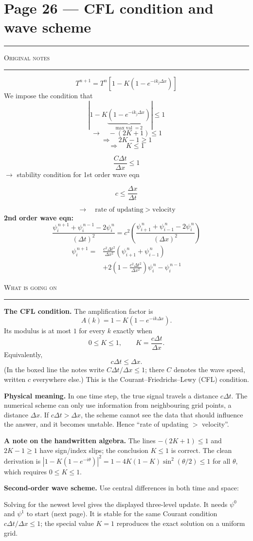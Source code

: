 \documentclass[10pt,a4paper]{article}
\newcommand{\fiteq}[1]{\par\noindent\adjustbox{max width=\linewidth}{$\displaystyle #1$}\par}
\newcommand{\pairpage}[3]{%
  \clearpage
  \section*{\normalsize Page #1}
  \vspace{-0.9em}
  {\color{black!35}\rule{\linewidth}{0.4pt}}\par\vspace{0.2em}
  \noindent
  \begin{minipage}[t]{0.473\textwidth}
    {\scriptsize\textsc{Original notes}}\par\vspace{0.15em}
    {\color{black!25}\rule{\linewidth}{0.3pt}}\par\vspace{0.2em}
    #2
  \end{minipage}%
  \hfill
  \begin{minipage}[t]{0.473\textwidth}
    {\scriptsize\textsc{What is going on}}\par\vspace{0.15em}
    {\color{black!25}\rule{\linewidth}{0.3pt}}\par\vspace{0.2em}
    #3
  \end{minipage}%
}
\begin{document}
\pairpage{26 --- CFL condition and wave scheme}{%
\[
T^{n+1}=T^n\left[1-K\left(1-e^{-ik_j\Delta x}\right)\right]
\]
We impose the condition that
\[
\left|1-K\underbrace{\left(1-e^{-ik_j\Delta x}\right)}
_{\text{max val }=2}\right|\le1
\]
\[
\longrightarrow\quad -(2K+1)\le1
\]
\[
\Rightarrow\quad 2K-1\ge1
\]
\[
\Rightarrow\quad \boxed{K\le1}
\]
\begin{handbox}
\[
\frac{C\Delta t}{\Delta x}\le1
\]
{\small $\to$ stability condition for 1st order wave eqn}
\end{handbox}
\begin{handbox}
\[
c\le\frac{\Delta x}{\Delta t}
\]
\end{handbox}
\[
\longrightarrow\quad\text{rate of updating}>\text{velocity}
\]
\textbf{2nd order wave eqn:}
\[
\frac{\psi_i^{\,n+1}+\psi_i^{\,n-1}-2\psi_i^{\,n}}{(\Delta t)^2}
=c^2\left(
\frac{\psi_{i+1}^{\,n}+\psi_{i-1}^{\,n}-2\psi_i^{\,n}}{(\Delta x)^2}
\right)
\]
\[
\begin{aligned}
\psi_i^{\,n+1}={}&\frac{c^2\Delta t^2}{\Delta x^2}
\left(\psi_{i+1}^{\,n}+\psi_{i-1}^{\,n}\right)\\
&+2\left(1-\frac{c^2\Delta t^2}{\Delta x^2}\right)\psi_i^{\,n}
-\psi_i^{\,n-1}
\end{aligned}
\]
}{%
\textbf{The CFL condition.} The amplification factor is
\[
A(k)=1-K(1-e^{-ik\Delta x}).
\]
Its modulus is at most $1$ for every $k$ exactly when
\[
0\le K\le1,
\qquad K=\frac{c\Delta t}{\Delta x}.
\]
Equivalently,
\[
c\Delta t\le\Delta x.
\]
(In the boxed line the notes write $C\Delta t/\Delta x\le1$; there $C$
denotes the wave speed, written $c$ everywhere else.)
This is the Courant--Friedrichs--Lewy (CFL) condition.

\textbf{Physical meaning.} In one time step, the true signal travels a
distance $c\Delta t$. The numerical scheme can only use information
from neighbouring grid points, a distance $\Delta x$. If
$c\Delta t>\Delta x$, the scheme cannot see the data that should
influence the answer, and it becomes unstable. Hence
``rate of updating $>$ velocity''.

\textbf{A note on the handwritten algebra.} The lines
$-(2K+1)\le1$ and $2K-1\ge1$ have sign/index slips; the conclusion
$K\le1$ is correct. The clean derivation is
$|1-K(1-e^{-i\theta})|^2=1-4K(1-K)\sin^2(\theta/2)\le1$ for all
$\theta$, which requires $0\le K\le1$.

\textbf{Second-order wave scheme.} Use central differences in both time
and space:
\fiteq{
\frac{\psi_i^{n+1}-2\psi_i^n+\psi_i^{n-1}}{\Delta t^2}
=c^2\frac{\psi_{i+1}^n-2\psi_i^n+\psi_{i-1}^n}{\Delta x^2}.
}
Solving for the newest level gives the displayed three-level update.
It needs $\psi^0$ and $\psi^1$ to start (next page). It is stable for
the same Courant condition $c\Delta t/\Delta x\le1$; the special value
$K=1$ reproduces the exact solution on a uniform grid.
}
\end{document}
